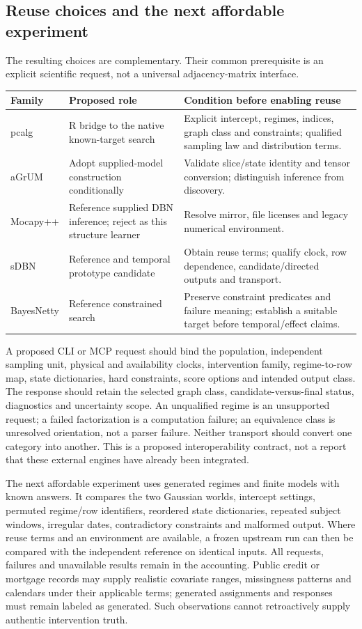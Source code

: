 \subsection{Reuse choices and the next affordable experiment}

The resulting choices are complementary. Their common prerequisite is an
explicit scientific request, not a universal adjacency-matrix interface.

\begin{longtable}{p{}p{}p{}}
\toprule
Family & Proposed role & Condition before enabling reuse\\
\midrule
\endhead
pcalg & R bridge to the native known-target search & Explicit intercept, regimes,
indices, graph class and constraints; qualified sampling law and distribution terms.\\
aGrUM & Adopt supplied-model construction conditionally & Validate slice/state
identity and tensor conversion; distinguish inference from discovery.\\
Mocapy++ & Reference supplied DBN inference; reject as this structure learner &
Resolve mirror, file licenses and legacy numerical environment.\\
sDBN & Reference and temporal prototype candidate & Obtain reuse terms; qualify
clock, row dependence, candidate/directed outputs and transport.\\
BayesNetty & Reference constrained search & Preserve constraint predicates and
failure meaning; establish a suitable target before temporal/effect claims.\\
\bottomrule
\end{longtable}

A proposed CLI or MCP request should bind the population, independent sampling
unit, physical and availability clocks, intervention family, regime-to-row map,
state dictionaries, hard constraints, score options and intended output class.
The response should retain the selected graph class, candidate-versus-final
status, diagnostics and uncertainty scope. An unqualified regime is an
unsupported request; a failed factorization is a computation failure; an
equivalence class is unresolved orientation, not a parser failure. Neither
transport should convert one category into another. This is a proposed
interoperability contract, not a report that these external engines have
already been integrated. \citep{exec16_ct_design}

The next affordable experiment uses generated regimes and finite models with
known answers. It compares the two Gaussian worlds, intercept settings,
permuted regime/row identifiers, reordered state dictionaries, repeated subject
windows, irregular dates, contradictory constraints and malformed output.
Where reuse terms and an environment are available, a frozen upstream run can
then be compared with the independent reference on identical inputs. All
requests, failures and unavailable results remain in the accounting. Public
credit or mortgage records may supply realistic covariate ranges, missingness
patterns and calendars under their applicable terms; generated assignments
and responses must remain labeled as generated. Such observations cannot
retroactively supply authentic intervention truth.

